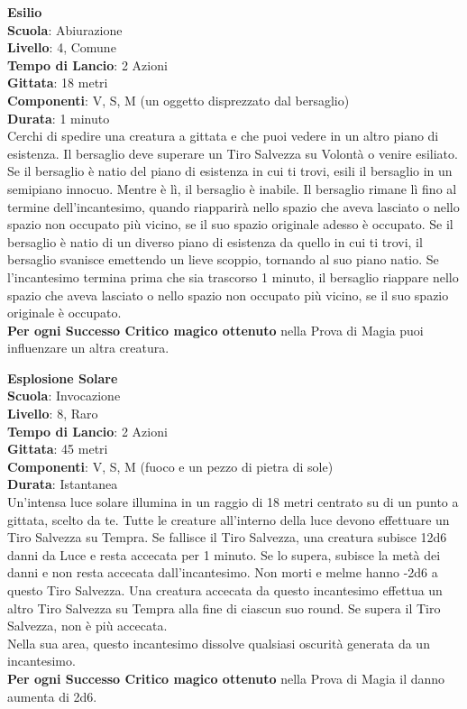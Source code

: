 \begin{multicols}{2}
\medskip\textbf{Esilio}\\
\textbf{Scuola}: Abiurazione\\
\textbf{Livello}: 4, Comune\\
\textbf{Tempo di Lancio}: 2 Azioni\\
\textbf{Gittata}: 18 metri\\
\textbf{Componenti}: V, S, M (un oggetto disprezzato dal bersaglio)\\
\textbf{Durata}: 1 minuto\\
Cerchi di spedire una creatura a gittata e che puoi vedere in un altro piano di esistenza. Il bersaglio deve superare un Tiro Salvezza su Volontà o venire esiliato. Se il bersaglio è natio del piano di esistenza in cui ti trovi, esili il bersaglio in un semipiano innocuo. Mentre è lì, il bersaglio è inabile. Il bersaglio rimane lì fino al termine dell'incantesimo, quando riapparirà nello spazio che aveva lasciato o nello spazio non occupato più vicino, se il suo spazio originale adesso è occupato. Se il bersaglio è natio di un diverso piano di esistenza da quello in cui ti trovi, il bersaglio svanisce emettendo un lieve scoppio, tornando al suo piano natio. Se l'incantesimo termina prima che sia trascorso 1 minuto, il bersaglio riappare nello spazio che aveva lasciato o nello spazio non occupato più vicino, se il suo spazio originale è occupato.\\
\textbf{Per ogni Successo Critico magico ottenuto} nella Prova di Magia puoi influenzare un altra creatura.

\medskip\textbf{Esplosione Solare}\\
\textbf{Scuola}: Invocazione\\
\textbf{Livello}: 8, Raro\\
\textbf{Tempo di Lancio}: 2 Azioni\\
\textbf{Gittata}: 45 metri\\
\textbf{Componenti}: V, S, M (fuoco e un pezzo di pietra di sole)\\
\textbf{Durata}: Istantanea\\
Un'intensa luce solare illumina in un raggio di 18 metri centrato su di un punto a gittata, scelto da te. Tutte le creature all'interno della luce devono effettuare un Tiro Salvezza su Tempra. Se fallisce il Tiro Salvezza, una creatura subisce 12d6 danni da Luce e resta accecata per 1 minuto. Se lo supera, subisce la metà dei danni e non resta accecata dall'incantesimo. Non morti e melme hanno -2d6 a questo Tiro Salvezza. Una creatura accecata da questo incantesimo effettua un altro Tiro Salvezza su Tempra alla fine di ciascun suo round. Se supera il Tiro Salvezza, non è più accecata.\\
Nella sua area, questo incantesimo dissolve qualsiasi oscurità generata da un incantesimo.\\
\textbf{Per ogni Successo Critico magico ottenuto} nella Prova di Magia il danno aumenta di 2d6.


\end{multicols}
